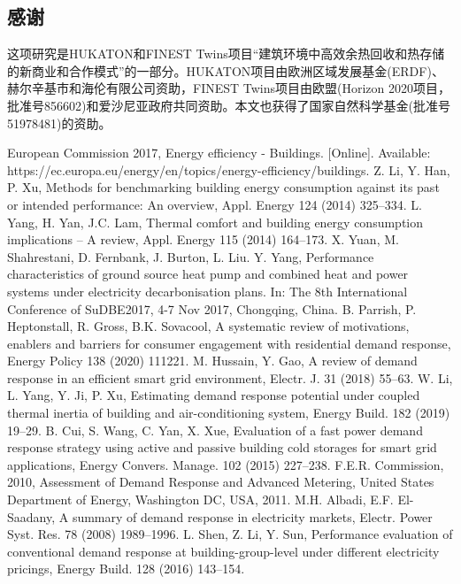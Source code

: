 \documentclass[hyperref]{ctexart}
\begin{document}
\begin{multicols}{2}
		\section*{感谢}
		这项研究是HUKATON和FINEST Twins项目“建筑环境中高效余热回收和热存储的新商业和合作模式”的一部分。HUKATON项目由欧洲区域发展基金(ERDF)、赫尔辛基市和海伦有限公司资助，FINEST Twins项目由欧盟(Horizon 2020项目，批准号856602)和爱沙尼亚政府共同资助。本文也获得了国家自然科学基金(批准号51978481)的资助。
		\par
		\begin{thebibliography}{100}%
			 European Commission 2017, Energy efficiency - Buildings. [Online]. Available: https://ec.europa.eu/energy/en/topics/energy-efficiency/buildings.
			 Z. Li, Y. Han, P. Xu, Methods for benchmarking building energy consumption against its past or intended performance: An overview, Appl. Energy 124 (2014) 325–334. 
			 L. Yang, H. Yan, J.C. Lam, Thermal comfort and building energy consumption implications – A review, Appl. Energy 115 (2014) 164–173.
			 X. Yuan, M. Shahrestani, D. Fernbank, J. Burton, L. Liu. Y. Yang, Performance characteristics of ground source heat pump and combined heat and power systems under electricity decarbonisation plans. In: The 8th International Conference of SuDBE2017, 4-7 Nov 2017, Chongqing, China. 
			 B. Parrish, P. Heptonstall, R. Gross, B.K. Sovacool, A systematic review of motivations, enablers and barriers for consumer engagement with residential demand response, Energy Policy 138 (2020) 111221. 
			 M. Hussain, Y. Gao, A review of demand response in an efficient smart grid environment, Electr. J. 31 (2018) 55–63. 
			 W. Li, L. Yang, Y. Ji, P. Xu, Estimating demand response potential under coupled thermal inertia of building and air-conditioning system, Energy Build. 182 (2019) 19–29. 
			 B. Cui, S. Wang, C. Yan, X. Xue, Evaluation of a fast power demand response strategy using active and passive building cold storages for smart grid applications, Energy Convers. Manage. 102 (2015) 227–238.
			 F.E.R. Commission, 2010, Assessment of Demand Response and Advanced Metering, United States Department of Energy, Washington DC, USA, 2011. 
			 M.H. Albadi, E.F. El-Saadany, A summary of demand response in electricity markets, Electr. Power Syst. Res. 78 (2008) 1989–1996. 
			 L. Shen, Z. Li, Y. Sun, Performance evaluation of conventional demand response at building-group-level under different electricity pricings, Energy Build. 128 (2016) 143–154. 

\end{thebibliography}
\end{multicols}
\end{document}
